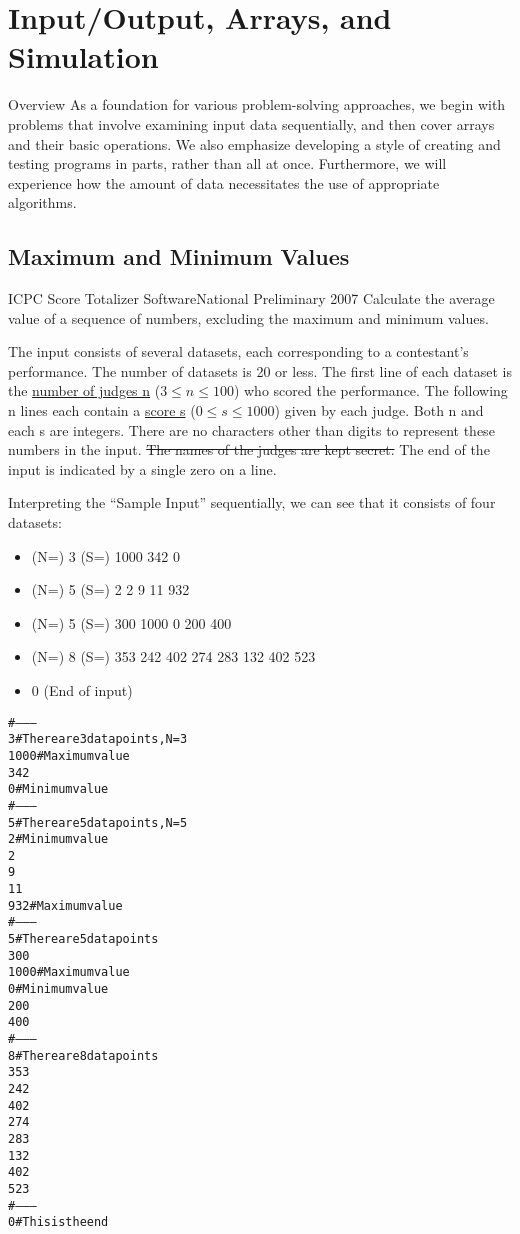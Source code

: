 \chapter{Input/Output, Arrays, and Simulation}\label{chapter:io}
\begin{itembox}[l]{Overview}
As a foundation for various problem-solving approaches, we begin with problems that involve examining input data sequentially, and then cover arrays and their basic operations.
We also emphasize developing a style of creating and testing programs in parts, rather than all at once.
Furthermore, we will experience how the amount of data necessitates the use of appropriate algorithms.
\end{itembox}
\section{Maximum and Minimum Values}

\begin{psbox}{ICPC Score Totalizer Software}{National Preliminary 2007}
Calculate the average value of a sequence of numbers, excluding the maximum and minimum values.

The input consists of several datasets, each corresponding to a contestant's performance. The number of datasets is 20 or less.
The first line of each dataset is the \uline{number of judges n} ($3 \le n \le 100$) who scored the performance. The following n lines each contain a \uline{score s} ($0 \le s \le 1000$) given by each judge. Both n and each s are integers. There are no characters other than digits to represent these numbers in the input. \sout{The names of the judges are kept secret.}
The end of the input is indicated by a single zero on a line.
  
\end{psbox}


Interpreting the ``Sample Input'' sequentially, we can see that it consists of four datasets:
\begin{itemize}
\item (N=) 3 (S=) 1000 342 0
\item (N=) 5 (S=) 2 2 9 11 932 
\item (N=) 5 (S=) 300 1000 0 200 400
\item (N=) 8 (S=) 353 242 402 274 283 132 402 523
\item 0 (End of input)
\end{itemize}

\begin{alltt}
#--------
3 # There are 3 data points, N=3
1000 # Maximum value
342
0 # Minimum value
#--------
5 # There are 5 data points, N=5
2 # Minimum value
2
9
11
932 # Maximum value
#--------
5 # There are 5 data points
300
1000 # Maximum value
0 # Minimum value
200
400
#--------
8 # There are 8 data points
353
242
402
274
283
132
402
523
#--------
0 # This is the end
\end{alltt}


